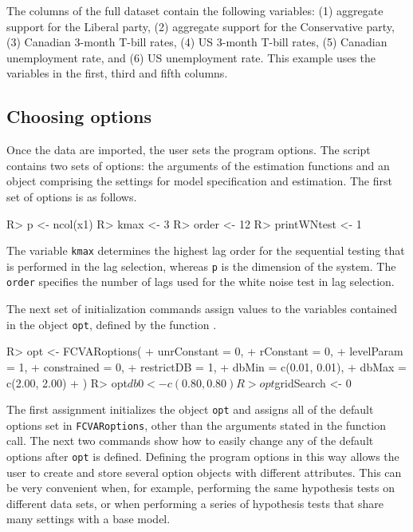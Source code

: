 \documentclass[article]{jss}
\newcommand{\fct}[1]{\code{#1()}}
\begin{document}
The columns of the full dataset contain the following variables: (1) aggregate support for the Liberal party, (2) aggregate support for the Conservative party, (3) Canadian 3-month T-bill rates, (4) US 3-month T-bill rates, (5) Canadian unemployment rate, and (6) US unemployment rate. 
This example uses the variables in the first, third and fifth columns. 

\subsection{Choosing options}
\label{subsec choosing options}




Once the data are imported, the user sets the program options. The script contains two sets of options: the arguments of the estimation functions and an object comprising the settings for model specification and estimation. 
The first set of options is as follows. 
\begin{Code}
R> p               <- ncol(x1) 
R> kmax            <- 3
R> order           <- 12
R> printWNtest     <- 1
\end{Code}

The variable \verb|kmax| determines the highest lag order for the sequential testing that is performed in the lag selection, whereas \verb|p| is the dimension of the system. 
The \verb|order| specifies the number of lags used for the white noise test in lag selection.

The next set of initialization commands
assign values to the variables contained in the object \verb|opt|, defined by the function \fct{FCVARoptions}. 

\begin{Code}
R> opt <- FCVARoptions(
 +    unrConstant  = 0,
 +    rConstant    = 0,
 +    levelParam   = 1,
 +    constrained  = 0,
 +    restrictDB   = 1,
 +    dbMin = c(0.01, 0.01),
 +    dbMax = c(2.00, 2.00)
 +    ) 
R> opt$db0 <- c(0.80, 0.80)
R> opt$gridSearch <- 0
\end{Code}

The first assignment initializes the object \verb|opt| and assigns all of the default options set in \verb|FCVARoptions|, 
other than the arguments stated in the function call. 
The next two commands
show how to easily change any of the default options after \verb|opt| is defined. 
Defining the program options in this way allows the user to create and store several option objects with different attributes. 
This can be very convenient when, for example, performing the same hypothesis tests on different data sets, 
or when performing a series of hypothesis tests that share many settings with a base model. 
\end{document}
